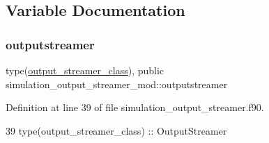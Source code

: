 \subsection{Variable Documentation}
\mbox{\label{namespacesimulation__output__streamer__mod_a6b95972f6387d7ce3231af3d25fedac5}} 
\subsubsection{\texorpdfstring{outputstreamer}{outputstreamer}}
{\footnotesize\ttfamily type(\mbox{\hyperlink{structsimulation__output__streamer__mod_1_1output__streamer__class}{output\+\_\+streamer\+\_\+class}}), public simulation\+\_\+output\+\_\+streamer\+\_\+mod\+::outputstreamer}



Definition at line 39 of file simulation\+\_\+output\+\_\+streamer.\+f90.


\begin{DoxyCode}
39     \textcolor{keywordtype}{type}(output\_streamer\_class) :: OutputStreamer
\end{DoxyCode}
